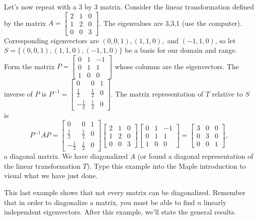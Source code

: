 \begin{example} \label{multiplicityex1}
Let's now repeat with a 3 by 3 matrix. 
Consider the linear transformation defined by the matrix
$A=  
\begin{bmatrix}
 2 & 1 & 0 \\
 1 & 2 & 0 \\
 0 & 0 & 3
\end{bmatrix} 
$. The eigenvalues are 3,3,1 (use the computer). Corresponding eigenvectors are $(0,0,1), (1,1,0),$ and $(-1,1,0)$, so let $S=\{(0,0,1), (1,1,0),(-1,1,0)\}$ be a basis for our domain and range.  Form the matrix 
$P=
\begin{bmatrix}
 0 & 1 & -1 \\
 0 & 1 & 1 \\
 1 & 0 & 0
\end{bmatrix} 
$ whose columns are the eigenvectors. The inverse of $P$ is 
$P^{-1} = 
\begin{bmatrix}
 0 & 0 & 1 \\
 \frac{1}{2} & \frac{1}{2} & 0 \\
 -\frac{1}{2} & \frac{1}{2} & 0
\end{bmatrix} 
$. The matrix representation of $T$ relative to $S$ is 
$$
P^{-1}AP=
\begin{bmatrix}
 0 & 0 & 1 \\
 \frac{1}{2} & \frac{1}{2} & 0 \\
 -\frac{1}{2} & \frac{1}{2} & 0
\end{bmatrix} 
 \begin{bmatrix}
 2 & 1 & 0 \\
 1 & 2 & 0 \\
 0 & 0 & 3
\end{bmatrix} 
\begin{bmatrix}
 0 & 1 & -1 \\
 0 & 1 & 1 \\
 1 & 0 & 0
\end{bmatrix} 
=
\begin{bmatrix}
 3 & 0 & 0 \\
 0 & 3 & 0 \\
 0 & 0 & 1
\end{bmatrix} 
,$$ a diagonal matrix.  We have diagonalized $A$ (or found a diagonal representation of the linear transformation $T$). Type this example into the Maple introduction to visual what we have just done.
\end{example}
This last example shows that not every matrix can be diagonalized.  Remember that in order to diagonalize a matrix, you must be able to find $n$ linearly independent eigenvectors. After this example, we'll state the general results.

